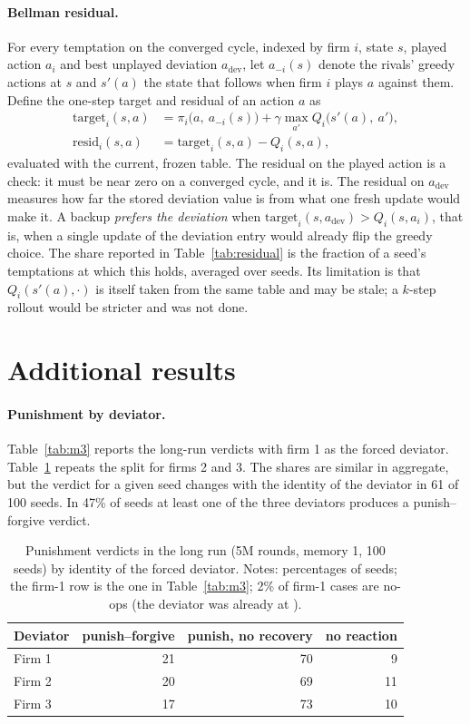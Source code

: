\paragraph{Bellman residual.} For every temptation on the converged cycle, indexed by firm $i$, state $s$, played action $a_i$ and best unplayed deviation $a_{\mathrm{dev}}$, let $a_{-i}(s)$ denote the rivals' greedy actions at $s$ and $s'(a)$ the state that follows when firm $i$ plays $a$ against them. Define the one-step target and residual of an action $a$ as
\begin{align*}
\mathrm{target}_i(s,a) &= \pi_i\big(a,\ a_{-i}(s)\big) + \gamma \max_{a'} Q_i\big(s'(a),\ a'\big), \\
\mathrm{resid}_i(s,a) &= \mathrm{target}_i(s,a) - Q_i(s,a),
\end{align*}
evaluated with the current, frozen table. The residual on the played action is a check: it must be near zero on a converged cycle, and it is. The residual on $a_{\mathrm{dev}}$ measures how far the stored deviation value is from what one fresh update would make it. A backup \emph{prefers the deviation} when $\mathrm{target}_i(s,a_{\mathrm{dev}}) > Q_i(s,a_i)$, that is, when a single update of the deviation entry would already flip the greedy choice. The share reported in Table~\ref{tab:residual} is the fraction of a seed's temptations at which this holds, averaged over seeds. Its limitation is that $Q_i(s'(a),\cdot)$ is itself taken from the same table and may be stale; a $k$-step rollout would be stricter and was not done.

\section{Additional results}\label{app:extra}

\paragraph{Punishment by deviator.} Table~\ref{tab:m3} reports the long-run verdicts with firm 1 as the forced deviator. Table~\ref{tab:app-deviator} repeats the split for firms 2 and 3. The shares are similar in aggregate, but the verdict for a given seed changes with the identity of the deviator in 61 of 100 seeds. In 47\% of seeds at least one of the three deviators produces a punish--forgive verdict.

\begin{table}[htbp]
\centering
\caption{Punishment verdicts in the long run (5M rounds, memory 1, 100 seeds) by identity of the forced deviator. Notes: percentages of seeds; the firm-1 row is the one in Table~\ref{tab:m3}; 2\% of firm-1 cases are no-ops (the deviator was already at ).}
\label{tab:app-deviator}
\begin{tabular}{lrrr}
\toprule
Deviator & punish--forgive & punish, no recovery & no reaction \\
\midrule
Firm 1 & 21 & 70 & 9 \\
Firm 2 & 20 & 69 & 11 \\
Firm 3 & 17 & 73 & 10 \\
\bottomrule
\end{tabular}
\end{table}

